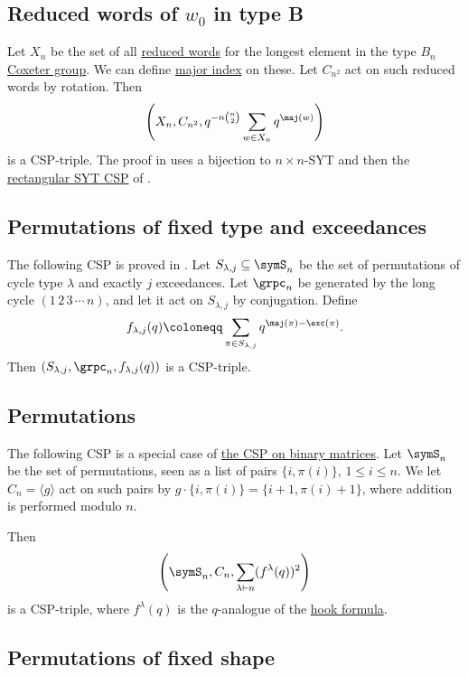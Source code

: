 \subsection[cspLongestTypeBReducedWords]{Reduced words of $w_0$ in type B}

Let $X_n$ be the set of all \hyperref[reducedWord]{reduced words} for the
longest element in the type $B_n$ \hyperref[coxeterGroups]{Coxeter group}.
We can define \hyperref[notationPermutations]{major index} on these.
Let $C_{n^2}$ act on such reduced words by rotation.
Then
\[
\left( X_n, C_{n^2}, q^{-n\binom{n}{2}}\sum_{w \in X_n} q^{\maj(w)} \right)
\]
is a CSP-triple.
The proof in \cite{PetersenSerrano2010} uses a bijection to
$n\times n$-SYT and then the \hyperref[cspRectangularSYT]{rectangular SYT CSP}
of .



\subsection[cspPermutations]{Permutations of fixed type and exceedances}

The following CSP is proved in \cite{SaganShareshianWachs2011}.
Let $S_{\lambda,j} \subseteq \symS_n$ be the set of permutations of
cycle type $\lambda$ and exactly $j$ exceedances.
Let $\grpc_n$ be generated by the long cycle $(1\,2\,3\,\dotsb\,n)$, and let
it act on $S_{\lambda,j}$ by conjugation.
Define
\[
f_{\lambda,j}(q) \coloneqq  \sum_{\pi \in S_{\lambda,j} } q^{\maj(\pi) - \exc(\pi)}.
\]
Then $(S_{\lambda,j}, \grpc_n, f_{\lambda,j}(q))$ is a CSP-triple.



\subsection[cspPermutations2]{Permutations}

The following CSP is a special case of \hyperref[csp01Matrices]{the CSP on binary matrices}.
Let $\symS_n$ be the set of permutations, seen as a list of pairs
$\{i,\pi(i)\}$, $1 \leq i \leq n$.
We let $C_n = \langle g \rangle$ act on such pairs by
$g \cdot \{i,\pi(i)\} = \{i+1,\pi(i)+1\}$,
where addition is performed modulo $n$.

Then
\[
\left( \symS_n, C_n, \sum_{\lambda \vdash n} (f^{\lambda}(q))^2 \right)
\]
is a CSP-triple, where $f^{\lambda}(q)$ is the $q$-analogue of the
\hyperref[prelimQHook]{hook formula}.


\subsection[cspPermutations3]{Permutations of fixed shape}


